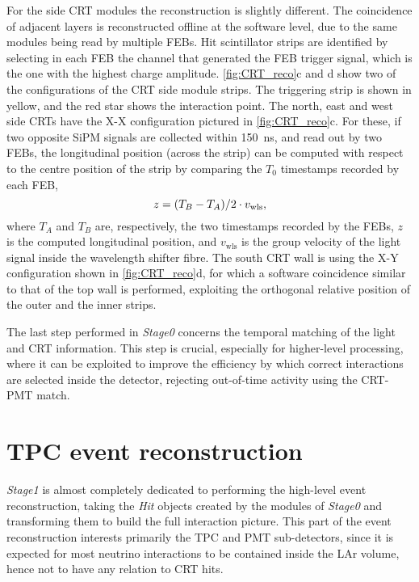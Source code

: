 For the side CRT modules the reconstruction is slightly different. The coincidence of adjacent layers is reconstructed offline at the software level, due to the same modules being read by multiple FEBs. Hit scintillator strips are identified by selecting in each FEB the channel that generated the FEB trigger signal, which is the one with the highest charge amplitude. \autoref{fig:CRT_reco}c and d show two of the configurations of the CRT side module strips. The triggering strip is shown in yellow, and the red star shows the interaction point. The north, east and west side CRTs have the X-X configuration pictured in \autoref{fig:CRT_reco}c. For these, if two opposite SiPM signals are collected within \SI{150}{\ns}, and read out by two FEBs, the longitudinal position (across the strip) can be computed with respect to the centre position of the strip by comparing the $T_0$ timestamps recorded by each FEB, \begin{equation}
    z = \qty(T_B - T_A)/2 \cdot v_\mathrm{wls}, 
\end{equation} where $T_A$ and $T_B$ are, respectively, the two timestamps recorded by the FEBs, $z$ is the computed longitudinal position, and $v_\mathrm{wls}$ is the group velocity of the light signal inside the wavelength shifter fibre. The south CRT wall is using the X-Y configuration shown in \autoref{fig:CRT_reco}d, for which a software coincidence similar to that of the top wall is performed, exploiting the orthogonal relative position of the outer and the inner strips. 

The last step performed in \emph{Stage0} concerns the temporal matching of the light and CRT information. This step is crucial, especially for higher-level processing, where it can be exploited to improve the efficiency by which correct interactions are selected inside the detector, rejecting out-of-time activity using the CRT-PMT match. 

\section{TPC event reconstruction} \label{sec:TPC_reco_gen}

\emph{Stage1} is almost completely dedicated to performing the high-level event reconstruction, taking the \emph{Hit} objects created by the modules of \emph{Stage0} and transforming them to build the full interaction picture. This part of the event reconstruction interests primarily the TPC and PMT sub-detectors, since it is expected for most neutrino interactions to be contained inside the LAr volume, hence not to have any relation to CRT hits. 

